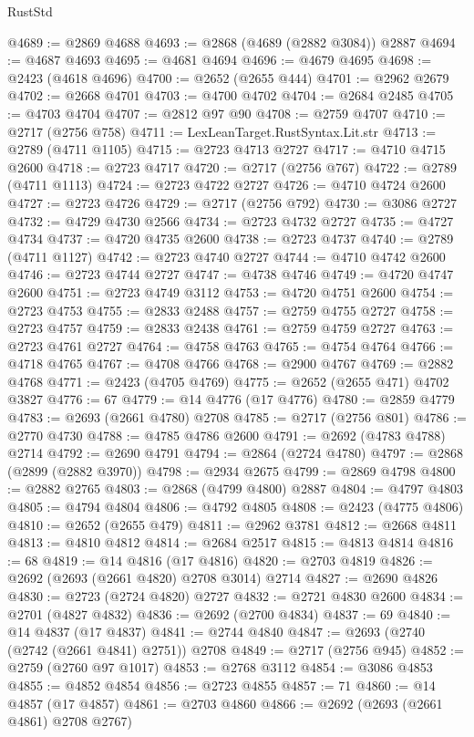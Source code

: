 \begin{lexlean}{RustStd}
\begin{coremodule}
@4689 := @2869 @4688
@4693 := @2868 (@4689 (@2882 @3084)) @2887
@4694 := @4687 @4693
@4695 := @4681 @4694
@4696 := @4679 @4695
@4698 := @2423 (@4618 @4696)
@4700 := @2652 (@2655 @444)
@4701 := @2962 @2679
@4702 := @2668 @4701
@4703 := @4700 @4702
@4704 := @2684 @2485
@4705 := @4703 @4704
@4707 := @2812 @97 @90
@4708 := @2759 @4707
@4710 := @2717 (@2756 @758)
@4711 := LexLeanTarget.RustSyntax.Lit.str
@4713 := @2789 (@4711 @1105)
@4715 := @2723 @4713 @2727
@4717 := @4710 @4715 @2600
@4718 := @2723 @4717
@4720 := @2717 (@2756 @767)
@4722 := @2789 (@4711 @1113)
@4724 := @2723 @4722 @2727
@4726 := @4710 @4724 @2600
@4727 := @2723 @4726
@4729 := @2717 (@2756 @792)
@4730 := @3086 @2727
@4732 := @4729 @4730 @2566
@4734 := @2723 @4732 @2727
@4735 := @4727 @4734
@4737 := @4720 @4735 @2600
@4738 := @2723 @4737
@4740 := @2789 (@4711 @1127)
@4742 := @2723 @4740 @2727
@4744 := @4710 @4742 @2600
@4746 := @2723 @4744 @2727
@4747 := @4738 @4746
@4749 := @4720 @4747 @2600
@4751 := @2723 @4749 @3112
@4753 := @4720 @4751 @2600
@4754 := @2723 @4753
@4755 := @2833 @2488
@4757 := @2759 @4755 @2727
@4758 := @2723 @4757
@4759 := @2833 @2438
@4761 := @2759 @4759 @2727
@4763 := @2723 @4761 @2727
@4764 := @4758 @4763
@4765 := @4754 @4764
@4766 := @4718 @4765
@4767 := @4708 @4766
@4768 := @2900 @4767
@4769 := @2882 @4768
@4771 := @2423 (@4705 @4769)
@4775 := @2652 (@2655 @471) @4702 @3827
@4776 := 67
@4779 := @14 @4776 (@17 @4776)
@4780 := @2859 @4779
@4783 := @2693 (@2661 @4780) @2708
@4785 := @2717 (@2756 @801)
@4786 := @2770 @4730
@4788 := @4785 @4786 @2600
@4791 := @2692 (@4783 @4788) @2714
@4792 := @2690 @4791
@4794 := @2864 (@2724 @4780)
@4797 := @2868 (@2899 (@2882 @3970))
@4798 := @2934 @2675
@4799 := @2869 @4798
@4800 := @2882 @2765
@4803 := @2868 (@4799 @4800) @2887
@4804 := @4797 @4803
@4805 := @4794 @4804
@4806 := @4792 @4805
@4808 := @2423 (@4775 @4806)
@4810 := @2652 (@2655 @479)
@4811 := @2962 @3781
@4812 := @2668 @4811
@4813 := @4810 @4812
@4814 := @2684 @2517
@4815 := @4813 @4814
@4816 := 68
@4819 := @14 @4816 (@17 @4816)
@4820 := @2703 @4819
@4826 := @2692 (@2693 (@2661 @4820) @2708 @3014) @2714
@4827 := @2690 @4826
@4830 := @2723 (@2724 @4820) @2727
@4832 := @2721 @4830 @2600
@4834 := @2701 (@4827 @4832)
@4836 := @2692 (@2700 @4834)
@4837 := 69
@4840 := @14 @4837 (@17 @4837)
@4841 := @2744 @4840
@4847 := @2693 (@2740 (@2742 (@2661 @4841) @2751)) @2708
@4849 := @2717 (@2756 @945)
@4852 := @2759 (@2760 @97 @1017)
@4853 := @2768 @3112
@4854 := @3086 @4853
@4855 := @4852 @4854
@4856 := @2723 @4855
@4857 := 71
@4860 := @14 @4857 (@17 @4857)
@4861 := @2703 @4860
@4866 := @2692 (@2693 (@2661 @4861) @2708 @2767)

\end{coremodule}
\end{lexlean}

